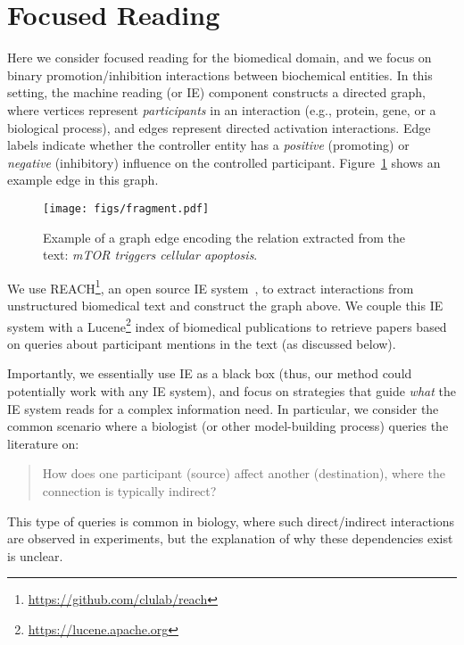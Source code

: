 \section{Focused Reading}\label{sec:focusedreading}

Here we consider focused reading for the biomedical domain, and we focus on binary promotion/inhibition interactions between biochemical entities. 
In this setting, the machine reading (or IE) component constructs a directed graph, where vertices represent {\em participants} in an interaction (e.g., protein, gene, or a biological process), and edges represent directed activation interactions. 
Edge labels indicate whether the controller entity has a {\em positive} (promoting) or {\em negative} (inhibitory) influence on the controlled participant. 
Figure~\ref{fig:fragment} shows an example edge in this graph.


\begin{figure}[t]
\begin{center}
  \texttt{[image: figs/fragment.pdf]}
  \caption{Example of a graph edge encoding the relation extracted from the text: \emph{mTOR triggers cellular apoptosis}.}\label{fig:fragment}
  \vspace{-3mm}
  \end{center}
\end{figure}

We use REACH\footnote{\url{https://github.com/clulab/reach}}, an open source IE system~\cite{Valenzuela:15}, to extract interactions from unstructured biomedical text and construct the graph above. %
We couple this IE system with a Lucene\footnote{\url{https://lucene.apache.org}} index of biomedical publications to retrieve papers based on queries about participant mentions in the text (as discussed below).

Importantly, we essentially use IE as a black box (thus, our method could potentially work with any IE system), and focus on strategies that guide {\em what} the IE system reads for a complex information need.
In particular, we consider the common scenario where a biologist (or other model-building process) queries the literature on:
\begin{quote}
 How does one participant (source) affect another (destination), where the connection is typically indirect?
 \end{quote}
 This type of queries is common in biology, where such direct/indirect interactions are observed in experiments, but the explanation of why these dependencies exist is unclear.
 
